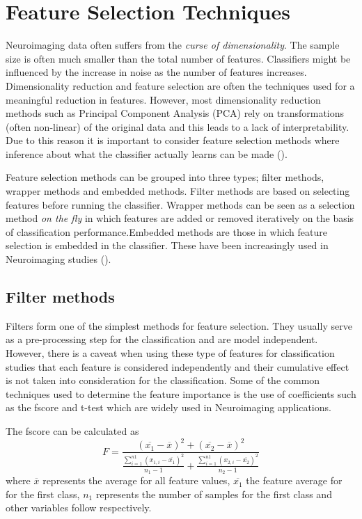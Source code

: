\documentclass[msthesis.tex]{subfiles}
\begin{document}
\section{Feature Selection Techniques}
\label{sec:feature_selection}
Neuroimaging data often suffers from the \textit{curse of dimensionality}. The sample size is often much smaller than the total number of features. Classifiers might be influenced by the increase in noise as the number of features increases. Dimensionality reduction and feature selection are often the techniques used for a meaningful reduction in features. However, most dimensionality reduction methods such as Principal Component Analysis (PCA) rely on transformations (often non-linear) of the original data and this leads to a lack of interpretability. Due to this reason it is important to consider feature selection methods where inference about what the classifier actually learns can be made (\cite{shi2018feature}). 

Feature selection methods can be grouped into three types; filter methods, wrapper methods and embedded methods. Filter methods are based on selecting features before running the classifier. Wrapper methods can be seen as a selection method \textit{on the fly} in which features are added or removed iteratively on the basis of classification performance.Embedded methods are those in which feature selection is embedded in the classifier. These have been increasingly used in Neuroimaging studies (\cite{tohka2016comparison}).

\subsection{Filter methods}
\label{subsec:filtermethods}
Filters form one of the simplest methods for feature selection. They usually serve as a pre-processing step for the classification and are model independent. However, there is a caveat when using these type of features for classification studies that each feature is considered independently and their cumulative effect is not taken into consideration for the classification. Some of the common techniques used to determine the feature importance is the use of coefficients such as the fscore and t-test which are widely used in Neuroimaging applications.

The fscore can be calculated as 
\begin{equation}
\label{eq:fscores}
    F = \frac{(\overline{x_{1}} - \overline{x})^2 + (\overline{x_{2}} - \overline{x})^2}
    {\frac{\sum_{i=1}^{n1}(x_{1,i} - \overline{x_{1}})^2}{n_{1} -1} + \frac{\sum_{i=1}^{n1}(x_{2,i} - \overline{x_{2}})^2}{n_{2} -1}}
\end{equation}
where $\overline{x}$ represents the average for all feature values, $\overline{x_{1}}$ the feature average for for the first class, $n_{1}$ represents the number of samples for the first class and other variables follow respectively.
\end{document}
